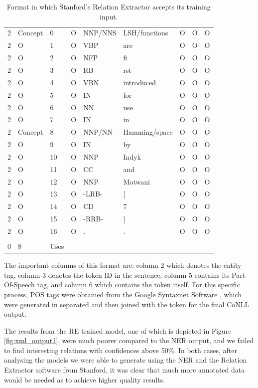 \documentclass[11pt,a4paper,openright]{memoir}
\begin{document}
\begin{table}[!htbp]
  \centering
    \begin{tabular}{lllllllll}
2 &	Concept &	0 &	O &	NNP/NNS &	LSH/functions &	O &	O &	O \\
2 &	O &	1 &	O &	VBP &	are & 	O &	O &	O \\
2 &	O &	2 &	O &	NFP &	fi &	O &	O &	O \\
2 &	O &	3 &	O &	RB &	 rst &	O &	O &	O \\
2 &	O &	4 &	O &	VBN &	introduced &	O &	O &	O \\
2 &	O &	5 &	O &	IN &	for &	O &	O &	O \\
2 &	O &	6 &	O &	NN &	use &	O &	O &	O \\
2 &	O &	7 &	O &	IN &	in &	O &	O &	O \\
2 &	Concept &	8 &	O &	NNP/NN &	Hamming/space &	O &	O &	O \\
2 &	O &	9 &	O &	IN &	by &	O &	O &	O \\
2 &	O &	10 &	O &	NNP &	Indyk &	O &	O &	O \\
2 &	O &	11 &	 O &	CC &	and &	O &	O &	O \\
2 &	O &	12 &	O &	NNP &	Motwani &	O &	O &	O \\
2 &	O &	13 &	O &	-LRB- &	[ &	O &	O &	O \\
2 &	O &	14 &	O &	CD &	7 &	O &	O &	O \\
2 &	O &	15 &	O &	-RRB- &	] &	O &	O &	O \\
2 &	O &	16 &	O &	. &	. &	O &	O &	O \\
 & & & & & & & & \\
0 & 8 & Uses & & & & & & \\
    \end{tabular}
  \caption[Format in which Stanford's Relation Extractor accepts its training input.]{Format in which Stanford's Relation Extractor accepts its training input.}
  \label{tab:format_for_relation_extractor_input}
\end{table}

The important columns of this format are: column 2 which denotes the entity tag, column 3 denotes the token ID in the sentence, column 5 contains its Part-Of-Speech tag, and column 6 which contains the token itself. For this specific process, POS tags were obtained from the Google Syntaxnet Software \cite{google-syntaxnet, DBLP:journals/corr/AndorAWSPGPC16}, which were generated in separated and then joined with the token for the final CoNLL output.

The results from the RE trained model, one of which is depicted in Figure \ref{fig:xml_output1}, were much poorer compared to the NER output, and we failed to find interesting relations with confidences above 50\%. In both cases, after analysing the models we were able to generate using the NER and the Relation Extractor software from Stanford, it was clear that much more annotated data would be needed as to achieve higher quality results.
\end{document}
